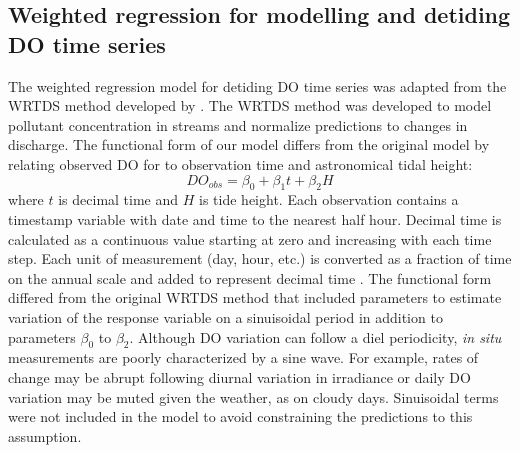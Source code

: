 \subsection{Weighted regression for modelling and detiding \ac{DO} time series}

The weighted regression model for detiding \ac{DO} time series was adapted from the \ac{WRTDS} method developed by \citet{Hirsch10}.  The \ac{WRTDS} method was developed to model pollutant concentration in streams and normalize predictions to changes in discharge.  The functional form of our model differs from the original model by relating observed \ac{DO} for to observation time and astronomical tidal height:
\begin{equation}\label{funform}
DO_{obs}= \beta_0 + \beta_1 t + \beta_2 H
\end{equation}
where $t$ is decimal time and $H$ is tide height. Each observation contains a timestamp variable with date and time to the nearest half hour.  Decimal time  is calculated as a continuous value starting at zero and increasing with each time step.  Each unit of measurement (day, hour, etc.) is converted as a fraction of time on the annual scale and added to represent decimal time \citep{Hirsch10}.  The functional form differed from the original \ac{WRTDS} method that included parameters to estimate variation of the response variable on a sinuisoidal period in addition to parameters $\beta_0$ to $\beta_2$.  Although \ac{DO} variation can follow a diel periodicity, \textit{in situ} measurements are poorly characterized by a sine wave.  For example, rates of change may be abrupt following diurnal variation in irradiance or daily \ac{DO} variation may be muted given the weather, as on cloudy days.  Sinuisoidal terms were not included in the model to avoid constraining the predictions to this assumption. 

